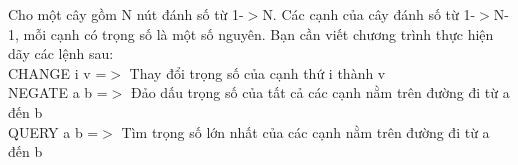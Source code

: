 Cho một cây gồm N nút đánh số từ 1-$>$N. Các cạnh của cây đánh số từ 1-$>$N-1, mỗi cạnh có trọng số là một số nguyên. Bạn cần viết chương trình thực hiện dãy các lệnh sau:   
\\   CHANGE i v =$>$ Thay đổi trọng số của cạnh thứ i thành v   
\\   NEGATE a b =$>$ Đảo dấu trọng số của tất cả các cạnh nằm trên đường đi từ a đến b   
\\   QUERY a b =$>$ Tìm trọng số lớn nhất của các cạnh nằm trên đường đi từ a đến b  

\